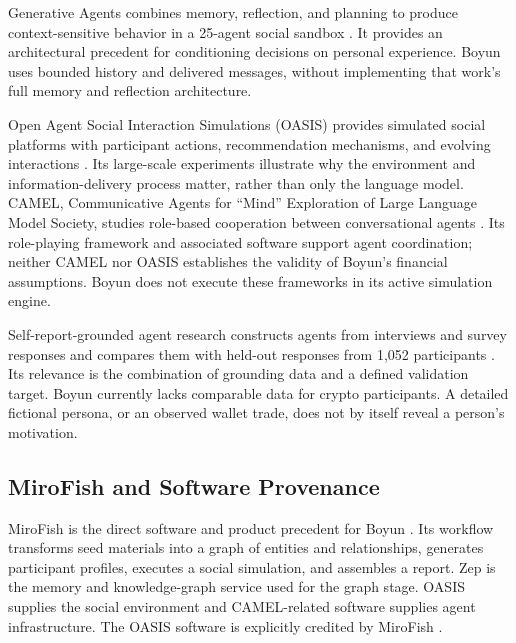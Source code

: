 Generative Agents combines memory, reflection, and planning to produce
context-sensitive behavior in a 25-agent social sandbox \cite{park2023}.
It provides an architectural precedent for conditioning decisions on personal
experience. Boyun uses bounded history and delivered messages, without
implementing that work's full memory and reflection architecture.

Open Agent Social Interaction Simulations (OASIS) provides simulated social
platforms with participant actions, recommendation mechanisms, and evolving
interactions \cite{yang2025}. Its large-scale experiments illustrate why the
environment and information-delivery process matter, rather than only the
language model. CAMEL, Communicative Agents for ``Mind'' Exploration of Large
Language Model Society, studies role-based cooperation between conversational
agents \cite{camel2023}. Its role-playing framework and associated software
support agent coordination; neither CAMEL nor OASIS establishes the validity
of Boyun's financial assumptions. Boyun does not execute these frameworks in
its active simulation engine.

Self-report-grounded agent research constructs agents from interviews and
survey responses and compares them with held-out responses from 1,052
participants \cite{park2026}. Its relevance is the combination of grounding
data and a defined validation target. Boyun currently lacks comparable data
for crypto participants. A detailed fictional persona, or an observed wallet
trade, does not by itself reveal a person's motivation.

\subsection{MiroFish and Software Provenance}\label{sec:mirofish}
MiroFish is the direct software and product precedent for Boyun
\cite{mirofish}. Its workflow transforms seed materials into a graph of
entities and relationships, generates participant profiles, executes a social
simulation, and assembles a report. Zep is the memory and knowledge-graph
service used for the graph stage. OASIS supplies the social environment and
CAMEL-related software supplies agent infrastructure. The OASIS software is
explicitly credited by MiroFish \cite{oasiscode}.

